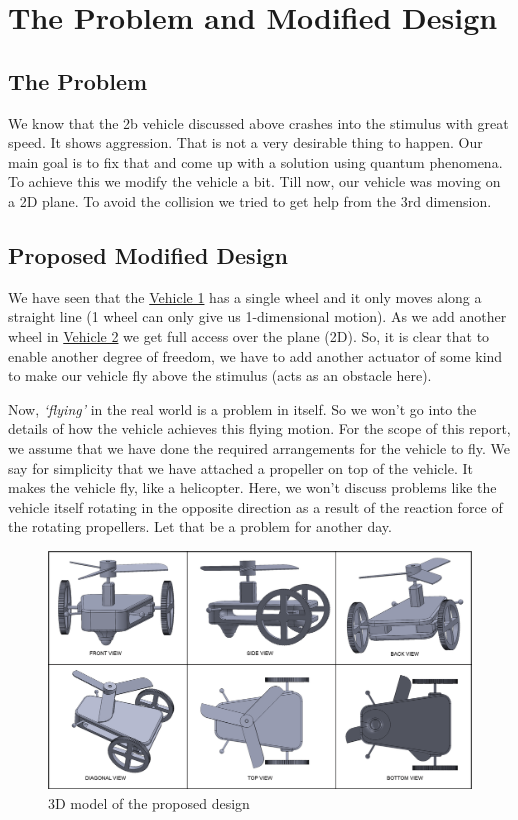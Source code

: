 
\section{The Problem and Modified Design}
    
    \subsection{The Problem}
    We know that the 2b vehicle discussed above crashes into the stimulus with great speed. It shows aggression. That is not a very desirable thing to happen. Our main goal is to fix that and come up with a solution using quantum phenomena. To achieve this we modify the vehicle a bit. Till now, our vehicle was moving on a 2D plane. To avoid the collision we tried to get help from the 3rd dimension.
    
    \subsection{Proposed Modified Design}
    We have seen that the \hyperref[sec:Vehicle_1]{Vehicle 1} has a single wheel and it only moves along a straight line (1 wheel can only give us 1-dimensional motion). As we add another wheel in \hyperref[sec:Vehicle_2]{Vehicle 2} we get full access over the plane (2D). So, it is clear that to enable another degree of freedom, we have to add another actuator of some kind to make our vehicle fly above the stimulus (acts as an obstacle here).

    Now, \textit{`flying'} in the real world is a problem in itself. So we won't go into the details of how the vehicle achieves this flying motion. For the scope of this report, we assume that we have done the required arrangements for the vehicle to fly. We say for simplicity that we have attached a propeller on top of the vehicle. It makes the vehicle fly, like a helicopter. Here, we won't discuss problems like the vehicle itself rotating in the opposite direction as a result of the reaction force of the rotating propellers. Let that be a problem for another day.

        \begin{figure}[t]%
            \centering
            \includegraphics[width=14cm]{./images/vehicle_3D_grouped.png} 
            \caption{3D model of the proposed design}%
            \label{fig:3D_design}%
        \end{figure}

